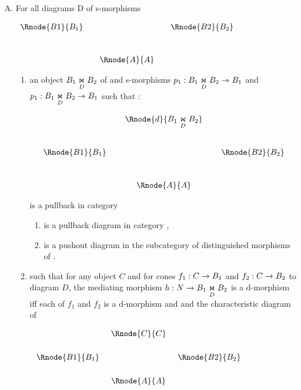 \documentclass[10pt,a4paper]{scrartcl}
\begin{document}
\begin{enumerate} [A.,leftmargin=0.5cm]
\begin{enumerate}[label*=\arabic*]
\end{enumerate}
	
	\item For all diagrams D of s-morphisms 
	\begin{center}
$
\begin{array}{cp{0cm}cp{0cm}c}
\Rnode{B1}{B_1}& &            &  &\Rnode{B2}{B_2} \\ [1.0cm]
               & &\Rnode{A}{A}& &
\end{array}
$
\end{center}
\begin{enumerate}[label*=\arabic*]
\item	
an object  $ \fibrex{B_1}{B_2}{D}$ of  and s-morphisms
$p_1: \fibrex{B_1}{B_2}{D} \smorph B_1$ and  $p_1: \fibrex{B_1}{B_2}{D} \smorph B_1$ such that :

\begin{center}
\begin{displaymath}
\begin{array}{cp{0.1cm}cp{0.1cm} c}
            & &\Rnode{d}{\fibrex{B_1}{B_2}{D}}                  \\ [1.0cm]
\Rnode{B1}{B_1}& &                & & \Rnode{B2}{B_2}           \\ [1.0cm]
                   & &\Rnode{A}{A}& &
\end{array}
\end{displaymath}
 
\end{center}

is a pullback in category 
\begin{enumerate}[label*=.\arabic*]
\item {} is a pullback diagram in category ,
\item {}  is a pushout diagram in the subcategory of distinguished morphisms of .
\end{enumerate}

\item {} such that for any 
object $C$ and for cones $f_1:C \morph B_1$ and $f_2:C \morph B_2$ to diagram $D$,
the mediating morphism $h: N \morph B_1 \underset{D}{\Join} B_2$ is a d-morphism iff 
each of $f_1$ and $f_2$  is a d-morphism and and the characteristic diagram of

\begin{center}
$
\setlength{\arraycolsep}{.25cm}
\begin{array}{ccc}
             & \Rnode{C}{C}&               \\ [0.6cm]
\Rnode{B1}{B_1}&             & \Rnode{B2}{B_2} \\ [0.6cm]
             &\Rnode{A}{A}& 
\end{array}
$
\end{center}


\end{enumerate}
\end{enumerate}
\end{document}
